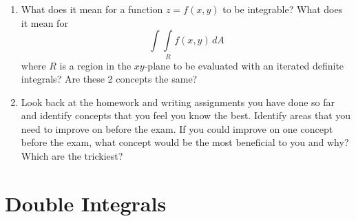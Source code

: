 \begin{enumerate}
\item  What does it mean for a function $z = f(x, y)$ to be integrable?  What does it mean for $$ \int\!\!\!\int\limits_R {f(x,y)\,dA}  $$  where $R$ is a region in the $xy$-plane to be evaluated with an iterated definite integrals?  Are these 2 concepts the same?  

\item  Look back at the homework and writing assignments you have done so far and identify concepts that you feel you know the best.  Identify areas that you need to improve on before the exam.  If you could improve on one concept before the exam, what concept would be the most beneficial to you and why? Which are the trickiest?   

\end{enumerate}
\section{Double Integrals}
